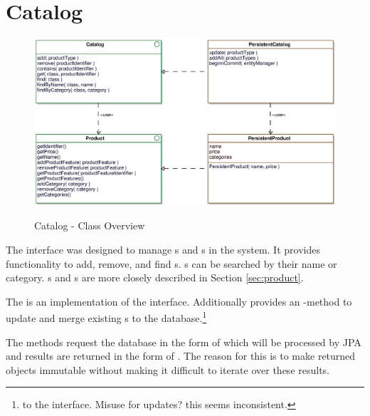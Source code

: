 \section{Catalog}
\label{sec:catalog}

\begin{figure}[ht]
	\centering
  \includegraphics[width=1.0\textwidth]{images/Catalog_Overview.eps}
	\label{catalog_overview}
	\caption{Catalog - Class Overview}
\end{figure}

The  interface was designed to manage s and s in the system.
It provides functionality to add, remove, and find s.
s can be searched by their name or category.
s and s are more closely described in Section \ref{sec:product}.

The  is an implementation of the  interface.
Additionally  provides an -method to update and merge existing s to the database.\footnote{ to the interface. Misuse  for updates? this seems inconsistent.}

The  methods request the database in the form of  which will be processed by JPA and results are returned in the form of . The reason for this is to make returned objects immutable without making it difficult to iterate over these results. 





